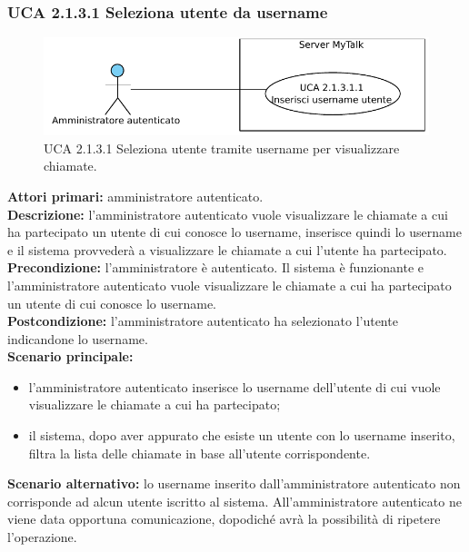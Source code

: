 \subsubsection{UCA 2.1.3.1 Seleziona utente da username}

\begin{figure}[htbp]
\centering
\includegraphics[scale=0.7]{./casi_uso/UCA2-1-3-1.pdf}
\caption{UCA 2.1.3.1 Seleziona utente tramite username per visualizzare chiamate.}
\end{figure}

\noindent
\textbf{Attori primari:} amministratore autenticato.\\
\textbf{Descrizione:} l'amministratore autenticato vuole visualizzare le chiamate a cui ha partecipato un utente di cui conosce lo username, inserisce quindi lo username e il sistema provvederà a visualizzare le chiamate a cui l'utente ha partecipato.\\
\textbf{Precondizione:} l'amministratore è autenticato. Il sistema è funzionante e l'amministratore autenticato vuole visualizzare le chiamate a cui ha partecipato un utente di cui conosce lo username.\\
\textbf{Postcondizione:} l'amministratore autenticato ha selezionato l'utente indicandone lo username.\\
\textbf{Scenario principale:}
\begin{itemize}
\item l'amministratore autenticato inserisce lo username dell'utente di cui vuole visualizzare le chiamate a cui ha partecipato;
\item il sistema, dopo aver appurato che esiste un utente con lo username inserito, filtra la lista delle chiamate in base all'utente corrispondente.
\end{itemize}
\textbf{Scenario alternativo:} lo username inserito dall'amministratore autenticato non corrisponde ad alcun utente iscritto al sistema. All'amministratore autenticato ne viene data opportuna comunicazione, dopodiché avrà la possibilità di ripetere l'operazione.

